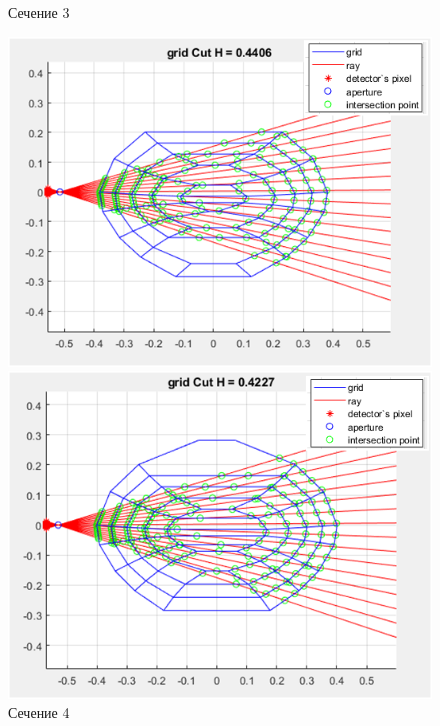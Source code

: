 \documentclass[a4]{article}
\begin{document}
\begin{figure}[H]
\begin{center}
\caption{Сечение 3}
\includegraphics{pic8.png} 

\caption{Сечение 4}
\includegraphics{pic9.png} 
\end{center}
\end{figure}
\end{document}
